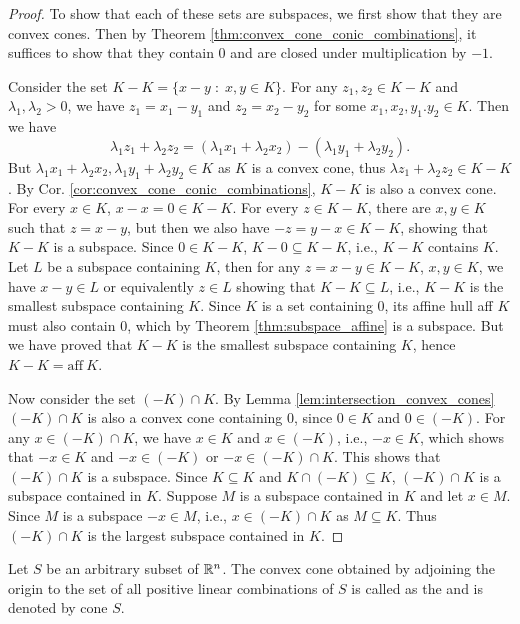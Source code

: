 \documentclass[11pt,a4paper]{article}
\begin{document}
\begin{proof}
    To show that each of these sets are subspaces, we first show that they are convex cones. Then by Theorem \ref{thm:convex_cone_conic_combinations}, it suffices to show that they contain $0$ and are closed under multiplication by $-1$. 
    
    Consider the set $K-K = \{x-y\;:\; x,y\in K\}$. For any $z_1,z_2\in K-K$ and $\lambda_1,\lambda_2>0$, we have $z_1 = x_1-y_1$ and $z_2 = x_2-y_2$ for some $x_1,x_2,y_1.y_2\in K$. Then we have
    \begin{equation*}
        \lambda_1 z_1+\lambda_2 z_2 = (\lambda_1 x_1 + \lambda_2 x_2) - (\lambda_1 y_1 + \lambda_2 y_2).
    \end{equation*}
    But $\lambda_1 x_1 + \lambda_2 x_2, \lambda_1 y_1 + \lambda_2 y_2\in K$ as $K$ is a convex cone, thus $\lambda z_1 +\lambda_2 z_2\in K-K$. By Cor. \ref{cor:convex_cone_conic_combinations}, $K-K$ is also a convex cone. For every $x\in K$, $x-x = 0 \in K-K$. For every $z\in K-K$, there are $x,y\in K$ such that $z = x-y$, but then we also have $-z = y-x\in K-K$, showing that $K-K$ is a subspace. Since $0\in K-K$, $K-0\subseteq K-K$, i.e., $K-K$ contains $K$. Let $L$ be a subspace containing $K$, then for any $z = x-y\in K-K$, $x,y\in K$, we have $x-y\in L$ or equivalently $z\in L$ showing that $K-K\subseteq L$, i.e., $K-K$ is the smallest subspace containing $K$. Since $K$ is a set containing $0$, its affine hull aff $K$ must also contain $0$, which by Theorem \ref{thm:subspace_affine} is a subspace. But we have proved that $K-K$ is the smallest subspace containing $K$, hence $K-K = \mathrm{aff}\ K$.

    Now consider the set $(-K)\cap K$. By Lemma \ref{lem:intersection_convex_cones} $(-K)\cap K$ is also a convex cone containing $0$, since $0\in K$ and $0\in (-K)$. For any $x\in (-K)\cap K$, we have $x\in K$ and $x\in (-K)$, i.e., $-x\in K$, which shows that $-x\in K$ and $-x\in (-K)$ or $-x\in (-K)\cap K$. This shows that $(-K)\cap K$ is a subspace. Since $K\subseteq K$ and $K\cap (-K)\subseteq K$, $(-K)\cap K$ is a subspace contained in $K$. Suppose $M$ is a subspace contained in $K$ and let $x\in M$. Since $M$ is a subspace $-x\in M$, i.e., $x\in (-K)\cap K$ as $M\subseteq K$. Thus $(-K)\cap K$ is the largest subspace contained in $K$.  
\end{proof}

\begin{definition}\label{def:convex_cone_generated_by_a_set}
    Let $S$ be an arbitrary subset of $\mathbb{R}^n$. The convex cone obtained by adjoining the origin to the set of all positive linear combinations of $S$ is called as the   and is denoted by cone $S$.
\end{definition}
\end{document}

